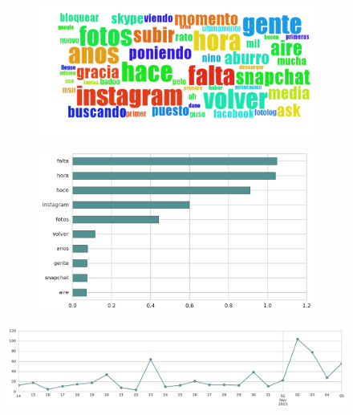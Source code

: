 \begin{figure}[htbp!]
    \centering
    \begin{subfigure}[b]{0.49\textwidth}
        \includegraphics[width=\textwidth]{twitter_all/report_images/topic-19-wordcloud.jpg}
    \end{subfigure}
    \begin{subfigure}[b]{0.49\textwidth}
        \includegraphics[width=\textwidth]{twitter_all/report_images/topic-19-terms.jpg}
    \end{subfigure}
\end{figure}

\begin{figure}[htbp!]
    \centering
    \includegraphics[width=\textwidth]{twitter_all/report_images/topic-19-timeseries.jpg}
\end{figure}

